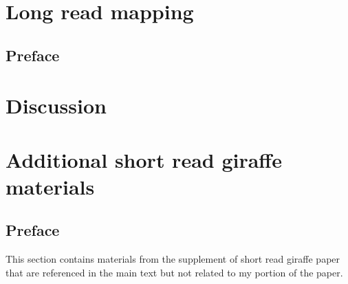 \documentclass[11pt]{ucscthesis}
\begin{document}
\chapter{Long read mapping}
\section{Preface}

\chapter{Discussion}

\appendix
\chapter{Additional short read giraffe materials}
\section{Preface}
This section contains materials from the supplement of short read giraffe paper \cite{sr_giraffe_2021} that are referenced in the main text but not related to my portion of the paper. 




\def\baselinestretch{1.0}\large\normalsize



\end{document}
